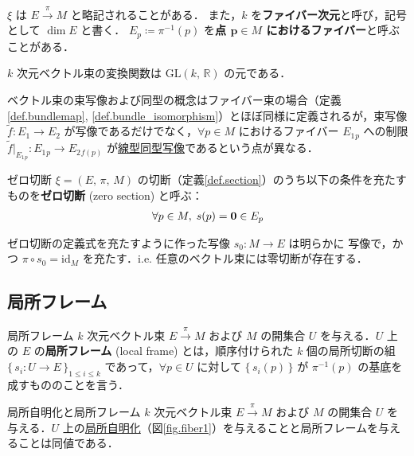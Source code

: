 \documentclass[geometry_main]{subfiles}
\begin{document}
$\xi$ は $E \xrightarrow{\pi} M$ と略記されることがある．
また，$k$ を\textbf{ファイバー次元}と呼び，記号として $\dim E$ と書く．
$E_p \coloneqq \pi^{-1}(p)$ を\textbf{点 $\bm{p} \in M$ におけるファイバー}と呼ぶことがある．

$k$ 次元ベクトル束の変換関数は $\mathrm{GL}(k,\, \mathbb{R})$ の元である．

\begin{marker}
	ベクトル束の束写像および同型の概念はファイバー束の場合（定義\ref{def.bundlemap}, \ref{def.bundle_isomorphism}）とほぼ同様に定義されるが，束写像 $\tilde{f} \colon E_1 \to E_2$ が\cinfty 写像であるだけでなく，$\forall p \in M$ におけるファイバー $E_1{}_p$ への制限 $\tilde{f}|_{E_1{}_p} \colon E_1{}_p \to E_2{}_{f(p)}$ が\underline{線型同型写像}であるという点が異なる．
\end{marker}

\begin{mydef}[label=def.zero_section]{ゼロ切断}
	$\xi = (E,\, \pi,\, M)$ の切断（定義\ref{def.section}）のうち以下の条件を充たすものを\textbf{ゼロ切断} (zero section) と呼ぶ：
	\begin{align}
		\forall p \in M,\; s(p) = \vb*{0} \in E_p
	\end{align}
\end{mydef}

\begin{marker}
	ゼロ切断の定義式を充たすように作った写像 $s_0 \colon M \to E$ は明らかに \cinfty 写像で，かつ $\pi\circ s_0 = \mathrm{id}_M$ を充たす．i.e. 任意のベクトル束には零切断が存在する．
\end{marker}


\subsection{局所フレーム}

\begin{mydef}[label=def.VB_frame]{局所フレーム}
	$k$ 次元ベクトル束 $E \xrightarrow{\pi} M$ および $M$ の開集合 $U$ を与える．$U$ 上の $E$ の\textbf{局所フレーム} (local frame) とは，順序付けられた $k$ 個の局所切断の組 $\{\, s_i \colon U \to E\, \}_{1\le i \le k}$ であって，$\forall p \in U$ に対して $\{\, s_i(p)\,\} $ が $\pi^{-1}(p)$ の基底を成すもののことを言う．
\end{mydef}

\begin{myprop}[label=prop.localtrivialization-frame]{局所自明化と局所フレーム}
	$k$ 次元ベクトル束 $E \xrightarrow{\pi} M$ および $M$ の開集合 $U$ を与える．$U$ 上の\hyperref[def.fiber-1]{局所自明化}（図\ref{fig.fiber1}）を与えることと局所フレームを与えることは同値である．
\end{myprop}
\end{document}
